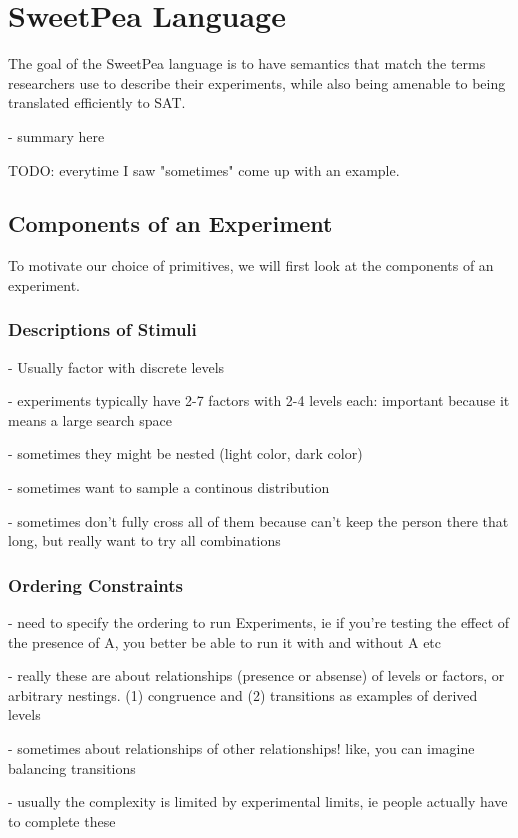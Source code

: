 
\chapter{SweetPea Language}

The goal of the SweetPea language is to have semantics that match the terms researchers use to describe their experiments, while also being amenable to being translated efficiently to SAT.

- summary here

TODO: everytime I saw "sometimes" come up with an example.

\section{Components of an Experiment}

To motivate our choice of primitives, we will first look at the components of an experiment.

\subsection{Descriptions of Stimuli}
- Usually factor with discrete levels

- experiments typically have 2-7 factors with 2-4 levels each: important because it means a large search space

- sometimes they might be nested (light color, dark color)

- sometimes want to sample a continous distribution

- sometimes don't fully cross all of them because can't keep the person there that long, but really want to try all combinations

\subsection{Ordering Constraints}
- need to specify the ordering to run Experiments, ie if you're testing the effect of the presence of A, you better be able to run it with and without A etc

- really these are about relationships (presence or absense) of levels or factors, or arbitrary nestings. (1) congruence and (2) transitions as examples of derived levels

- sometimes about relationships of other relationships! like, you can imagine balancing transitions

- usually the complexity is limited by experimental limits, ie people actually have to complete these

